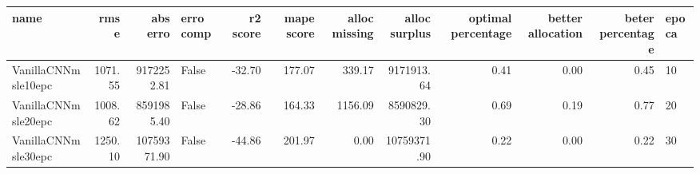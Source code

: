 \begin{tabular}{lrrlrrrrrrrl}
\toprule
name & rmse & abs erro & erro comp & r2 score & mape score & alloc missing & alloc surplus & optimal percentage & better allocation & beter percentage & epoca \\
\midrule
VanillaCNNmsle10epc & 1071.55 & 9172252.81 & False & -32.70 & 177.07 & 339.17 & 9171913.64 & 0.41 & 0.00 & 0.45 & 10 \\
VanillaCNNmsle20epc & 1008.62 & 8591985.40 & False & -28.86 & 164.33 & 1156.09 & 8590829.30 & 0.69 & 0.19 & 0.77 & 20 \\
VanillaCNNmsle30epc & 1250.10 & 10759371.90 & False & -44.86 & 201.97 & 0.00 & 10759371.90 & 0.22 & 0.00 & 0.22 & 30 \\
\bottomrule
\end{tabular}
